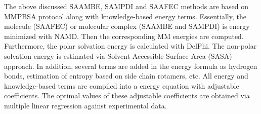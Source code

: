 \documentclass[9pt,tutorial]{livecoms}
\begin{document}
The above discussed SAAMBE, SAMPDI and SAAFEC methods are based on MMPBSA protocol along with knowledge-based energy terms. Essentially, the molecule (SAAFEC) or molecular complex (SAAMBE and SAMPDI) is energy minimized with NAMD. Then the corresponding MM energies are computed. Furthermore, the polar solvation energy is calculated with DelPhi. The non-polar solvation energy is estimated via Solvent Accessible Surface Area (SASA) approach. In addition, several terms are added in the energy formula as hydrogen bonds, estimation of entropy based on side chain rotamers, etc. All energy and knowledge-based terms are compiled into a energy equation with adjustable coefficients. The optimal values of these adjustable coefficients are obtained via multiple linear regression against experimental data\cite{petukh2016saambe,peng2017predicting,getov2016saafec}.
\end{document}
